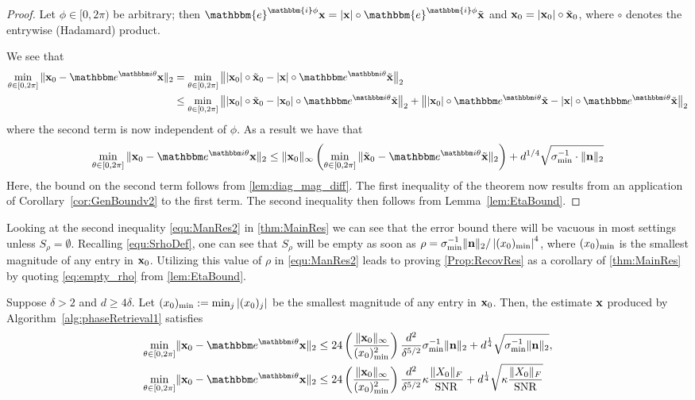 \begin{proof}

Let $\phi \in [0,2 \pi)$ be arbitrary; then $\mathbbm{e}^{\mathbbm{i} \phi }\x = |\x| \circ \mathbbm{e}^{\mathbbm{i} \phi} \tilde{\x}$ and $\mathbf x_0 = |\mathbf x_0| \circ \tilde{\mathbf x}_0$, where $\circ$ denotes the entrywise (Hadamard) product.

We see that%
\begin{align*}
\mintheta \| \x_0 - \eit\x \|_2 &= \min_{\theta \in [0, 2 \pi]} \left\| |\x_0| \circ \tilde{\x}_0 - |\x| \circ \eit \tilde{\x} \right\|_2 \\
&\leq \mintheta \left\| |\x_0| \circ \tilde{\x}_0 - |\x_0| \circ \eit \tilde{\x}  \right\|_2 + \left\| |\x_0| \circ \eit \tilde{\x}  - |\x| \circ \eit \tilde{\x}  \right\|_2 
\end{align*}
where the second term is now independent of $\phi$.  As a result we have that
\begin{equation*}
  \mintheta \| \x_0 - \eit \x \|_2 \leq \| \x_0 \|_{\infty} \left( \mintheta \| \tilde{\x}_0 - \eit \tilde{\x} \|_2 \right) + d^{1/4} \sqrt{\sigma_{\min}^{-1} \cdot \| \n \|_2 }
\end{equation*}
Here, the bound on the second term follows from \cref{lem:diag_mag_diff}.  The first inequality of the theorem now results from an application of Corollary~\ref{cor:GenBoundv2} to the first term.  The second inequality then follows from Lemma~\ref{lem:EtaBound}.
\end{proof}

Looking at the second inequality \eqref{equ:ManRes2} in \cref{thm:MainRes} we can see that the error bound there will be vacuous in most settings unless $S_\rho = \emptyset$.  Recalling \eqref{equ:SrhoDef}, one can see that $S_\rho$ will be empty as soon as $\rho = \sigma_{\min}^{-1} \| \mathbf n \|_2 / \left| (x_0)_{\rm min} \right|^4$, where $(x_0)_{\rm min}$ is the smallest magnitude of any entry in $\mathbf x_0$.  Utilizing this value of $\rho$ in \eqref{equ:ManRes2} leads to proving \cref{Prop:RecovRes} as a corollary of \cref{thm:MainRes} by quoting \eqref{eq:empty_rho} from \cref{lem:EtaBound}.

\begin{corollary} \label{Cor:RecovRes}
Suppose $\delta > 2$ and $d \ge 4 \delta$.  Let $(x_0)_{\rm min} := \min_j |(x_0)_j|$ be the smallest magnitude of any entry in $\mathbf x_0$.  Then, the estimate $\mathbf x$ produced by Algorithm~\ref{alg:phaseRetrieval1} satisfies 
\[\begin{aligned}
\mintheta \norm{\x_0 - \eit \x}_2 &\leq 24 \left( \frac{\norm{\x_0}_{\infty}}{(x_0)^2_{\rm min}} \right) \frac{d^2}{\delta^{5/2}} \sigma_{\min}^{-1} \norm{\n}_2 + d^{\frac{1}{4}} \sqrt{\sigma_{\min}^{-1} \norm{\n}_2 }, \\
\mintheta \norm{\x_0 - \eit \x}_2 &\leq 24 \left( \frac{\norm{\x_0}_{\infty}}{(x_0)^2_{\rm min}} \right) \frac{d^2}{\delta^{5/2}} \kappa \frac{\norm{X_0}_F}{\SNR} + d^{\frac{1}{4}} \sqrt{\kappa \frac{\norm{X_0}_F}{\SNR} }
\end{aligned}
\]
\end{corollary}

